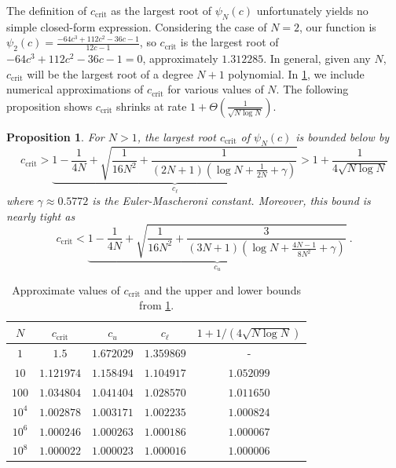 \documentclass[11pt]{article}
\numberwithin{equation}{section}
\newtheorem{proposition}[thm]{Proposition}
\theoremstyle{definition}
\theoremstyle{definition}
\theoremstyle{definition}
\newcommand{\1}{\mathbf{1}}
\newcommand{\cCrit}{c_\mathrm{crit}}
\newcommand{\harmonicUpperBd}{\log N + \frac{1}{2N} + \gamma}
\newcommand{\harmonicLowerBd}{\log N + \frac{4N-1}{8N^2} + \gamma}
\begin{document}
The definition of $\cCrit$ as the largest root of $\psi_N(c)$ unfortunately yields no simple closed-form expression. Considering the case of $N=2$, our function is $\psi_2(c)=\frac{-64c^3+112c^2-36c-1}{12c-1}$, so $\cCrit$ is the largest root of $-64c^3+112c^2-36c-1=0$, approximately $1.312285$.
In general, given any $N$, $\cCrit$ will be the largest root of a degree $N+1$ polynomial. In \cref{Tbl:cStarData}, we include numerical approximations of $\cCrit$ for various values of $N$. The following proposition shows $\cCrit$ shrinks at rate $1 + \Theta\left(\frac{1}{\sqrt{N \log N}}\right)$.
\begin{proposition}\label{Prop:cCritBd}
    For $N > 1$, the largest root $\cCrit$ of $\psi_N(c)$ is bounded below by
    \begin{equation}
        \cCrit > \underbrace{1 -\frac{1}{4N} + \sqrt{\frac{1}{16N^2}+\frac{1}{(2N+1)(\harmonicUpperBd)}}}_{c_\ell} > 1 + \frac{1}{4\sqrt{N \log N}}
    \end{equation}
    where $\gamma\approx 0.5772$ is the Euler-Mascheroni constant. Moreover, this bound is nearly tight  as 
    \begin{equation*}
        \cCrit < \underbrace{1 -\frac{1}{4N} + \sqrt{\frac{1}{16N^2}+\frac{3}{(3N+1)(\harmonicLowerBd)}}}_{c_u} \ . 
    \end{equation*}
\end{proposition}

\begin{table}
    \centering\footnotesize
    \begin{tabular}{|c|c|c|c|c|}
        \hline
         $N$ & $\cCrit$ & $c_u$ & $c_\ell$ & $1+1/(4\sqrt{N \log N})$\\
         \hline
         $1$    & $1.5$      & $1.672029$ & $1.359869$ & - \\ 
         $10$   & $1.121974$ & $1.158494$ & $1.104917$ & $1.052099$ \\
         $100$  & $1.034804$ & $1.041404$ & $1.028570$ & $1.011650$ \\
         $10^4$ & $1.002878$ & $1.003171$ & $1.002235$ & $1.000824$ \\
         $10^6$ & $1.000246$ & $1.000263$ & $1.000186$ & $1.000067$ \\
         $10^8$ & $1.000022$ & $1.000023$ & $1.000016$ & $1.000006$ \\
        \hline
    \end{tabular}
    \caption{Approximate values of $\cCrit$ and the upper and lower bounds from \cref{Prop:cCritBd}.}
    \label{Tbl:cStarData}
\end{table}
\end{document}
